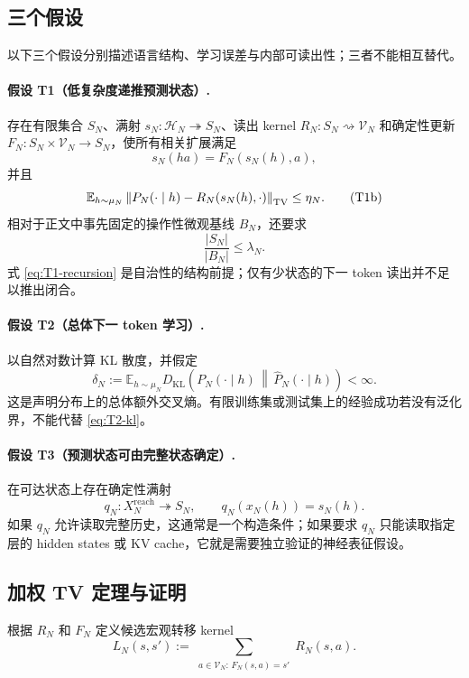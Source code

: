 \subsection{三个假设}

以下三个假设分别描述语言结构、学习误差与内部可读出性；三者不能相互替代。

\paragraph{假设 T1（低复杂度递推预测状态）.}
存在有限集合 $S_N$、满射 $s_N:\mathcal H_N\twoheadrightarrow S_N$、读出 kernel
$R_N:S_N\rightsquigarrow\mathcal V_N$ 和确定性更新
$F_N:S_N\times\mathcal V_N\to S_N$，使所有相关扩展满足
\[
 s_N(ha)=F_N(s_N(h),a),
 \tag{T1a}\label{eq:T1-recursion}
\]
并且
\[
 \mathbb E_{h\sim\mu_N}
 \left\|P_N(\cdot\mid h)-R_N(s_N(h),\cdot)\right\|_{\operatorname{TV}}
 \le \eta_N.
 \tag{T1b}\label{eq:T1-readout}
\]
相对于正文中事先固定的操作性微观基线 $B_N$，还要求
\[
 \frac{|S_N|}{|B_N|}\le\lambda_N.
 \tag{T1c}\label{eq:T1-complexity}
\]
式 \eqref{eq:T1-recursion} 是自治性的结构前提；仅有少状态的下一 token 读出并不足以推出闭合。

\paragraph{假设 T2（总体下一 token 学习）.}
以自然对数计算 KL 散度，并假定
\[
 \delta_N
 :=\mathbb E_{h\sim\mu_N}
 D_{\mathrm{KL}}\!\left(
 P_N(\cdot\mid h)\,\middle\|\,
 \widehat P_N(\cdot\mid h)
 \right)<\infty.
 \tag{T2}\label{eq:T2-kl}
\]
这是声明分布上的总体额外交叉熵。有限训练集或测试集上的经验成功若没有泛化界，不能代替 \eqref{eq:T2-kl}。

\paragraph{假设 T3（预测状态可由完整状态确定）.}
在可达状态上存在确定性满射
\[
 q_N:X_N^{\mathrm{reach}}\twoheadrightarrow S_N,
 \qquad q_N(x_N(h))=s_N(h).
 \tag{T3}\label{eq:T3-readout}
\]
如果 $q_N$ 允许读取完整历史，这通常是一个构造条件；如果要求 $q_N$ 只能读取指定层的 hidden states 或 KV cache，它就是需要独立验证的神经表征假设。

\subsection{加权 TV 定理与证明}

根据 $R_N$ 和 $F_N$ 定义候选宏观转移 kernel
\[
 L_N(s,s')
 :=\sum_{\substack{a\in\mathcal V_N:\,F_N(s,a)=s'}}R_N(s,a).
 \tag{S.1}\label{eq:transformer-macro-kernel}
\]

